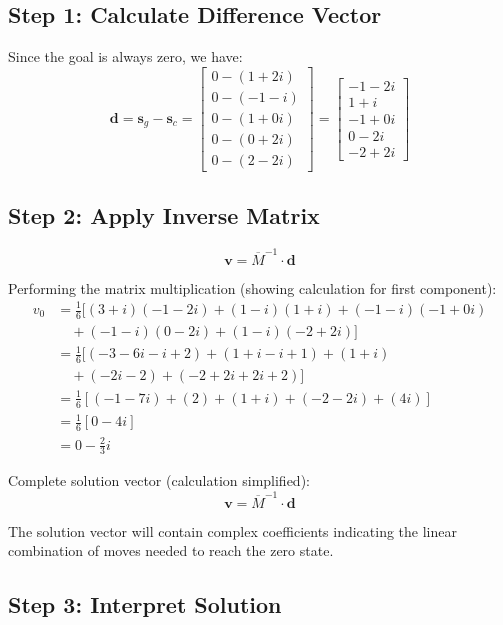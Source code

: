 \documentclass{article}
\begin{document}
\subsection{Step 1: Calculate Difference Vector}

Since the goal is always zero, we have:
\[
\mathbf{d} = \mathbf{s}_g - \mathbf{s}_c = \begin{bmatrix}
    0 - (1+2i) \\
    0 - (-1-i) \\
    0 - (1+0i) \\
    0 - (0+2i) \\
    0 - (2-2i)
\end{bmatrix} = \begin{bmatrix}
    -1 - 2i \\
    1 + i \\
    -1 + 0i \\
    0 - 2i \\
    -2 + 2i
\end{bmatrix}
\]

\subsection{Step 2: Apply Inverse Matrix}

\[
\mathbf{v} = \overline{M}^{-1} \cdot \mathbf{d}
\]

Performing the matrix multiplication (showing calculation for first component):
\begin{align}
v_0 &= \frac{1}{6}[(3+i)(-1-2i) + (1-i)(1+i) + (-1-i)(-1+0i) \\
    &\quad + (-1-i)(0-2i) + (1-i)(-2+2i)] \\
    &= \frac{1}{6}[(-3-6i-i+2) + (1+i-i+1) + (1+i) \\
    &\quad + (-2i-2) + (-2+2i+2i+2)] \\
    &= \frac{1}{6}[(-1-7i) + (2) + (1+i) + (-2-2i) + (4i)] \\
    &= \frac{1}{6}[0 - 4i] \\
    &= 0 - \frac{2}{3}i
\end{align}

Complete solution vector (calculation simplified):
\[
\mathbf{v} = \overline{M}^{-1} \cdot \mathbf{d}
\]

The solution vector will contain complex coefficients indicating the linear combination of moves needed to reach the zero state.

\subsection{Step 3: Interpret Solution}
\end{document}

